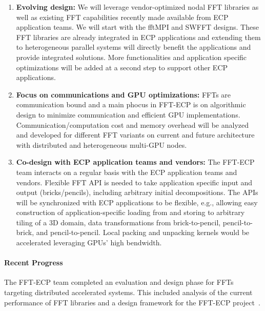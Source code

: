 \begin{enumerate}
\item
\textbf{Evolving design:}
We will leverage vendor-optimized nodal FFT libraries as well as existing 
FFT capabilities recently made available from ECP application teams.
We will start with the fftMPI and SWFFT designs. These FFT libraries
are already integrated in ECP applications and extending them to
heterogeneous parallel systems will directly benefit the applications
and provide integrated solutions. More functionalities and application
specific optimizations will be added at a second step to support other 
ECP applications. 
\item
\textbf{Focus on communications and GPU optimizations:}
FFTs are communication bound and a main phocus in FFT-ECP is on algorithmic
design to minimize communication and efficient GPU implementations. 
Communication/computation cost and memory overhead will be analyzed and developed
for different FFT variants on current and future architecture with distributed 
and heterogeneous multi-GPU nodes. 
\item
\textbf{Co-design with ECP application teams and vendors:}
The FFT-ECP team interacts on a regular basis with the ECP application teams
and vendors. Flexible FFT API is needed to take application specific input and 
output (bricks/pencils), including arbitrary initial decompositions. 
The APIs will be synchronized with ECP applications to be flexible, e.g., 
allowing easy construction of application-specific loading from 
and storing to arbitrary tiling of a 3D domain, data transformations from 
brick-to-pencil, pencil-to-brick, and pencil-to-pencil. Local packing and 
unpacking kernels would be accelerated leveraging GPUs’ high bendwidth.
\end{enumerate}

\paragraph{Recent Progress}
The FFT-ECP team completed an evaluation and design phase for FFTs targeting distributed 
accelerated systems. This included analysis of the current performance of FFT 
libraries and a design framework for the FFT-ECP project~\cite{thsd2018ECPFFT}. 


